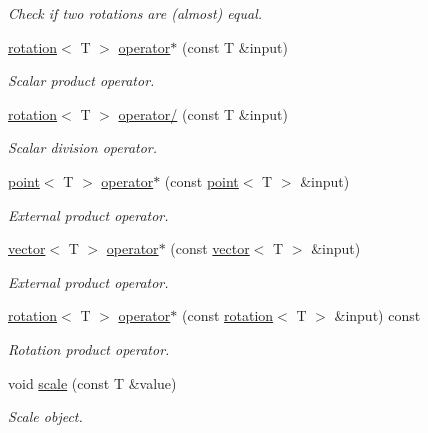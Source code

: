 \begin{DoxyCompactItemize}
\begin{DoxyCompactList}\small\item\em Check if two rotations are (almost) equal. \end{DoxyCompactList}\item 
\hyperlink{classddd_1_1rotation}{rotation}$<$ T $>$ \hyperlink{classddd_1_1rotation_aada9691ca7067feefd0a0206f8c8d035}{operator$\ast$} (const T \&input)
\begin{DoxyCompactList}\small\item\em Scalar product operator. \end{DoxyCompactList}\item 
\hyperlink{classddd_1_1rotation}{rotation}$<$ T $>$ \hyperlink{classddd_1_1rotation_ac95799a9a25f9653d39ab3339b8085b7}{operator/} (const T \&input)
\begin{DoxyCompactList}\small\item\em Scalar division operator. \end{DoxyCompactList}\item 
\hyperlink{classddd_1_1point}{point}$<$ T $>$ \hyperlink{classddd_1_1rotation_a5761f38de833fde1a6c299ba1e1dc844}{operator$\ast$} (const \hyperlink{classddd_1_1point}{point}$<$ T $>$ \&input)
\begin{DoxyCompactList}\small\item\em External product operator. \end{DoxyCompactList}\item 
\hyperlink{classddd_1_1vector}{vector}$<$ T $>$ \hyperlink{classddd_1_1rotation_a1b55d8f810793caa469b12a2ca41ee6c}{operator$\ast$} (const \hyperlink{classddd_1_1vector}{vector}$<$ T $>$ \&input)
\begin{DoxyCompactList}\small\item\em External product operator. \end{DoxyCompactList}\item 
\hyperlink{classddd_1_1rotation}{rotation}$<$ T $>$ \hyperlink{classddd_1_1rotation_a974dff537d71eef1dd26420b9b4e087d}{operator$\ast$} (const \hyperlink{classddd_1_1rotation}{rotation}$<$ T $>$ \&input) const
\begin{DoxyCompactList}\small\item\em Rotation product operator. \end{DoxyCompactList}\item 
void \hyperlink{classddd_1_1rotation_ab4911ee3dd5709e25f6dc7db6bad2c21}{scale} (const T \&value)
\begin{DoxyCompactList}\small\item\em Scale object. \end{DoxyCompactList}\item 

\end{DoxyCompactItemize}
